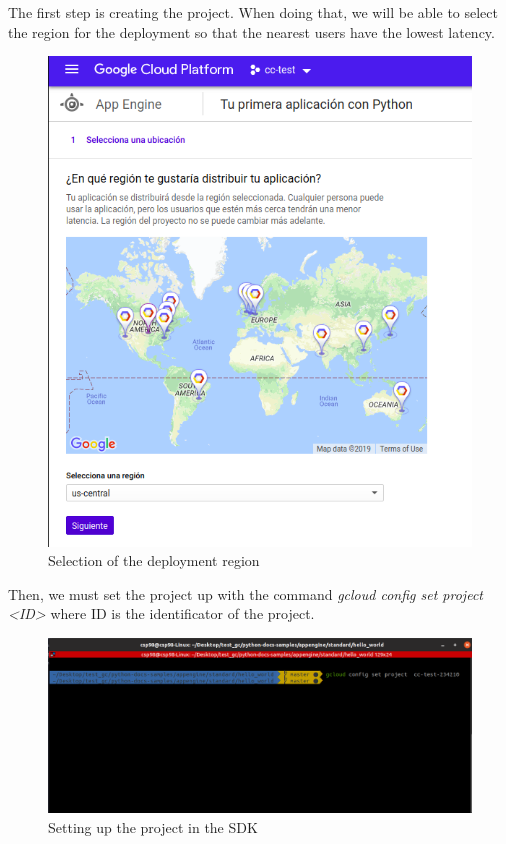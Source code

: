 \documentclass[12pt,english]{article}
\begin{document}
The first step is creating the project. When doing that, we will be able to select the region for the deployment so that the nearest users have the lowest latency.\\

\begin{figure}[H]
  \centering
  \includegraphics[scale = 0.5]{../img/tutorial/1select_region}
  \caption{Selection of the deployment region}
\end{figure}

 Then, we must set the project up with the command \emph{gcloud config set project <ID>} where ID is the identificator of the project.

 \begin{figure}[H]
   \centering
   \includegraphics[scale = 0.5]{../img/tutorial/3setproject}
   \caption{Setting up the project in the SDK}
 \end{figure}
\end{document}
